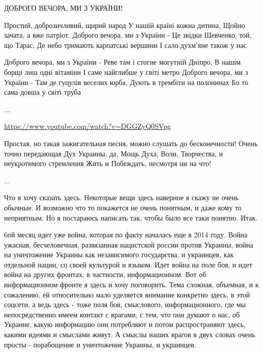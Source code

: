  
 
 
 
 

ДОБРОГО ВЕЧОРА, МИ З УКРАЇНИ!

Простий, доброзичливий, щирий народ
У нашій країні кожна дитина, 
Щойно зачата, а вже патріот. 
Доброго вечора, ми з України - 
Це звідки Шевченко, той, що Тарас,
Де небо тримають карпатські вершини
І сало духм'яне також у нас 

Доброго вечора, ми з України - 
Реве там і стогне могутній Дніпро,
В нашім борщі лиш одні вітаміни
І саме найглибше у світі метро
Доброго вечора, ми з України -
Там де гуцулів веселих юрба,
Дують в трембіти на полонинах
Бо то сама довша у світі труба

...

\url{https://www.youtube.com/watch?v=DGGZyQ0SVpg}

Простая, но такая зажигательная песня, можно слушать до бесконечности!  Очень
точно передающая Дух Украины, да, Мощь Духа, Воли, Творчества, и неукротимого
стремления Жить и Побеждать, несмотря ни на что!

...

Что я хочу сказать здесь. Некоторые вещи здесь наверное я скажу не очень
обычные.  И возможно что то покажется не очень понятным, и даже кому то
неприятным.  Но я постараюсь написать так, чтобы было все таки понятно. Итак. 

6ой месяц идет уже война, которая по факту началась еще в 2014 году. Война
ужасная, бесчеловечная, развязанная нацистской россии против Украины, война на
уничтожение Украины как независимого государства, и украинцев, как отдельной
нации, со своей культурой и языком.  Идет война на поле боя, и идет война на
других фронтах, в частности, информационном. Вот об информационном фронте я
здесь и хочу поговорить. Тема сложная, объемная, и к сожалению, ей относительно
мало уделяется внимание конкретно здесь, в этой соцсети, а ведь здесь - тоже
поля боя, смыслового, информационного, где мы непосредственно имеем контакт с
врагами, с тем, что они думают о нас, об Украине, какую информацию они
потребляют и потом распространяют здесь, какими идеями и смыслами живут. А
смыслы наших врагов в двух словах очень просты - порабощение и уничтожение
Украины, и украинцев. 


